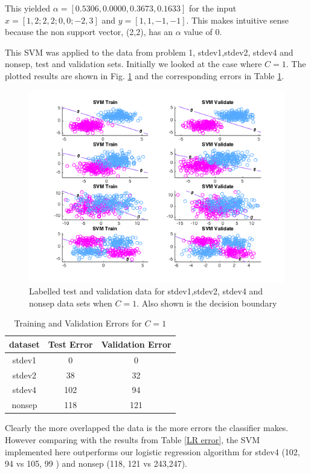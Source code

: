 \documentclass[12pt, twocolumn]{article}
\begin{document}
This yielded $\alpha = [0.5306, 0.0000, 0.3673, 0.1633]$ for the input $x = [1,2 ; 2,2 ; 0,0 ; -2,3]$ and $y = [1,1,-1,-1]$. This makes intuitive sense because the non support vector, (2,2), has an $\alpha$ value of 0.


This SVM was applied to the data from problem 1, stdev1,stdev2, stdev4 and nonsep, test and validation sets. Initially we looked at the case where $C =1$. The plotted results are shown in Fig. \ref{SVM C1} and the corresponding errors in Table \ref{SVM C1 T}. 


 \begin{figure}
\center
\includegraphics[scale =.4]{p2C1.png}
\caption{Labelled test and validation data for stdev1,stdev2, stdev4 and nonsep data sets when $C=1$. Also shown is the decision boundary }
\label{SVM C1}
\end{figure}

 \begin{table}
 \caption{ Training and Validation Errors for $C=1$}
  \begin{tabular}{ | c | c | c | }
 \hline
 dataset & Test Error & Validation Error  \\ \hline 
 stdev1 & 0 & 0 \\ \hline
 stdev2 & 38 & 32 \\ \hline
 stdev4 & 102 & 94 \\ \hline 
 nonsep & 118 & 121 \\ \hline
 \end{tabular}
 \label{SVM C1 T}
\end{table}


Clearly the more overlapped the data is the more errors the classifier makes. However comparing with the results from Table \ref{LR error}, the SVM implemented here outperforms our logistic regression algorithm for stdev4 (102, 94 vs 105, 99 ) and nonsep (118, 121 vs  243,247). 
\end{document}
